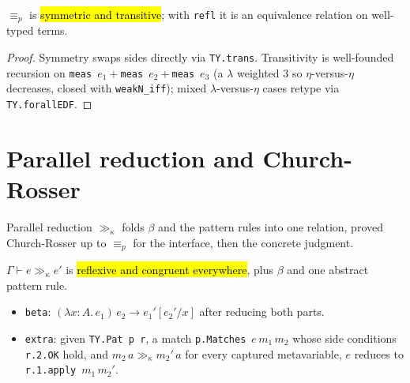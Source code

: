 \begin{theorem}
\label{thm:expb-normaleq-trans}
\leanok
{}

 $\equiv_p$ is \hl{symmetric and transitive}; with \texttt{refl} it is an equivalence
relation on well-typed terms.
\end{theorem}
\begin{proof}
\leanok
{} Symmetry swaps sides directly via \texttt{TY.trans}. Transitivity is well-founded
recursion on \texttt{meas}~$e_1+$\texttt{meas}~$e_2+$\texttt{meas}~$e_3$ (a $\lambda$ weighted $3$ so
$\eta$-versus-$\eta$ decreases, closed with \texttt{weakN\_iff}); mixed $\lambda$-versus-$\eta$ cases
retype via \texttt{TY.forallEDF}.
\end{proof}

\section{Parallel reduction and Church-Rosser}

Parallel reduction $\gg_\kappa$ folds $\beta$ and the pattern rules into one relation, proved
Church-Rosser up to $\equiv_p$ for the interface, then the concrete judgment.

\begin{definition}
\label{inductive:expb-parred}
\leanok
{}

 $\Gamma\vdash e\gg_\kappa e'$ is \hl{reflexive and congruent everywhere}, plus
$\beta$ and one abstract pattern rule.
\begin{itemize}
\item \texttt{beta}: $(\lambda x{:}A.\,e_1)\,e_2 \to e_1'[e_2'/x]$ after reducing both parts.
\item \texttt{extra}: given \texttt{TY.Pat p r}, a match \texttt{p.Matches}~$e\,m_1\,m_2$ whose side
conditions \texttt{r.2.OK} hold, and $m_2\,a\gg_\kappa m_2'\,a$ for every captured metavariable, $e$
reduces to \texttt{r.1.apply}~$m_1\,m_2'$.
\end{itemize}
\end{definition}


